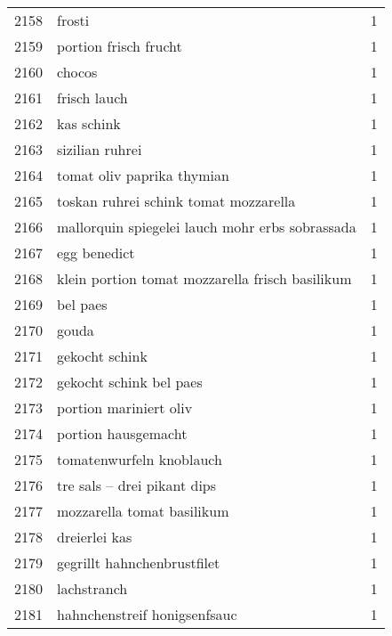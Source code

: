 \begin{tabular}{llr}
2158 &                                             frosti &      1 \\
2159 &                              portion frisch frucht &      1 \\
2160 &                                             chocos &      1 \\
2161 &                                       frisch lauch &      1 \\
2162 &                                         kas schink &      1 \\
2163 &                                    sizilian ruhrei &      1 \\
2164 &                         tomat oliv paprika thymian &      1 \\
2165 &              toskan ruhrei schink tomat mozzarella &      1 \\
2166 &    mallorquin spiegelei lauch mohr erbs sobrassada &      1 \\
2167 &                                       egg benedict &      1 \\
2168 &    klein portion tomat mozzarella frisch basilikum &      1 \\
2169 &                                           bel paes &      1 \\
2170 &                                              gouda &      1 \\
2171 &                                     gekocht schink &      1 \\
2172 &                            gekocht schink bel paes &      1 \\
2173 &                             portion mariniert oliv &      1 \\
2174 &                                portion hausgemacht &      1 \\
2175 &                           tomatenwurfeln knoblauch &      1 \\
2176 &                        tre sals – drei pikant dips &      1 \\
2177 &                         mozzarella tomat basilikum &      1 \\
2178 &                                      dreierlei kas &      1 \\
2179 &                        gegrillt hahnchenbrustfilet &      1 \\
2180 &                                        lachstranch &      1 \\
2181 &                       hahnchenstreif honigsenfsauc &      1 \\

\end{tabular}
